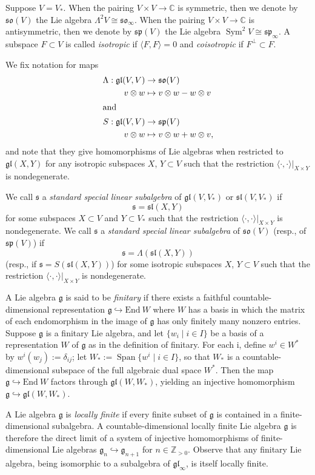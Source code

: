 \documentclass{amsart}
\theoremstyle{definition}
\theoremstyle{remark}
\numberwithin{equation}{section}
\newcommand {\Z} {\mathbb{Z}}
\newcommand {\C} {\mathbb{C}}
\newcommand {\End} {\mathrm{End}\:}
\def\gl{\mathfrak {gl}}
\def\g{\mathfrak {g}}
\def\sl{\mathfrak{sl}}
\def\so{\mathfrak{so}}
\def\sp{\mathfrak{sp}}
\def\s{\mathfrak{s}}
\newcommand {\Span}{\operatorname{Span}}
\newcommand{\Sym}{\operatorname{Sym}}
\begin{document}
Suppose $V = V_*$.  When the pairing $V \times V \rightarrow \C$ is symmetric, then we denote by $\so(V)$ the Lie algebra $\Lambda^2 V \cong \so_\infty$.  When the pairing $V \times V \rightarrow \C$ is antisymmetric, then we denote by $\sp(V)$ the Lie algebra $\Sym^2 V \cong \sp_\infty$.   A subspace $F \subset V$ is called \emph{isotropic} if $\langle F, F \rangle = 0$ and \emph{coisotropic} if $F^\perp \subset F$.

We fix notation for maps
\begin{align*}
\Lambda : \gl(V,V) & \rightarrow \so(V) \\
v \otimes w & \mapsto v \otimes w - w \otimes v \\
\intertext{and}
S : \gl(V,V) & \rightarrow \sp(V) \\
v \otimes w & \mapsto v \otimes w + w \otimes v,
\end{align*}
and note that they give homomorphisms of Lie algebras when restricted to $\gl(X,Y)$ for any isotropic subspaces $X$, $Y \subset V$ such that the restriction $\langle \cdot , \cdot \rangle |_{X \times Y}$ is nondegenerate.

We call $\s$ a \emph{standard special linear subalgebra} of $\gl(V,V_*)$ or $\sl(V,V_*)$ if 
$$\s = \sl(X,Y)$$
for some subspaces $X \subset V$ and $Y \subset V_*$ such that the restriction $\langle \cdot , \cdot \rangle |_{X \times Y}$
 is nondegenerate.  We call $\s$ a \emph{standard special linear subalgebra} of $\so(V)$ (resp., of $\sp(V)$) if 
$$\s = \Lambda( \sl(X,Y))$$
(resp., if $\s = S( \sl(X,Y) ) $)
for some isotropic subspaces $X$, $Y \subset V$ such that the restriction
$\langle \cdot , \cdot \rangle |_{X \times Y}$ is nondegenerate. 

A Lie algebra $\g$ is said to be \emph{finitary} if there exists a faithful countable-dimensional representation $\g \hookrightarrow \End W$ where $W$ has a basis in which the matrix of each endomorphism in the image of $\g$ has only finitely many nonzero entries.  Suppose $\g$ is a finitary Lie algebra, and let $\{ w_i \mid i \in I \}$ be a basis of a representation $W$ of $\g$ as in the definition of finitary.  For each i, define $w^i \in W^*$ by $w^i (w_j) := \delta_{ij}$;  let $W_*:= \Span \{ w^i \mid i \in I \}$, so that $W_*$ is a countable-dimensional subspace of the full algebraic dual space $W^*$.  Then the map $\g \hookrightarrow \End W$ factors through $\gl(W,W_*)$, yielding an injective homomorphism $\g \hookrightarrow \gl(W,W_*)$.

A Lie algebra $\g$ is \emph{locally finite} if every finite subset of $\g$ is contained in a finite-dimensional subalgebra.  A countable-dimensional locally finite Lie algebra $\g$ is therefore the direct limit of a system of injective homomorphisms of finite-dimensional Lie algebras $\g_n \hookrightarrow \g_{n+1}$ for $n \in \Z_{>0}$.  Observe that any finitary Lie algebra, being isomorphic to a subalgebra of $\gl_\infty$, is itself locally finite.
\end{document}
